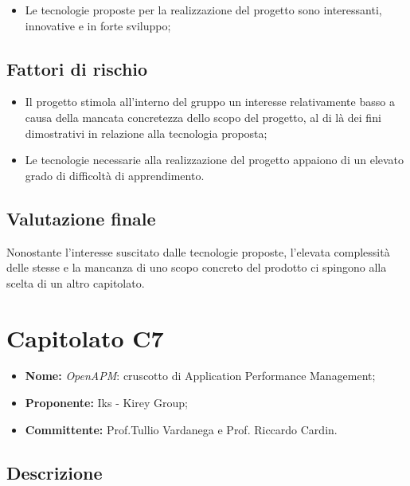 \documentclass[openany,12pt,a4paper]{report}
\begin{document}
	\begin{itemize}
		\item Le tecnologie proposte per la realizzazione del progetto sono interessanti, innovative e in forte sviluppo;
	\end{itemize}

	\subsection{Fattori di rischio}

	\begin{itemize}
		\item Il progetto stimola all'interno del gruppo un interesse relativamente basso a causa della mancata concretezza dello scopo del progetto, al di là dei fini dimostrativi in relazione alla tecnologia proposta;

		\item Le tecnologie necessarie alla realizzazione del progetto appaiono di un elevato grado di difficoltà di apprendimento.
	\end{itemize}

	\subsection{Valutazione finale}

	Nonostante l'interesse suscitato dalle tecnologie proposte, l'elevata complessità delle stesse e la mancanza di uno scopo concreto del prodotto ci spingono alla scelta di un altro capitolato.


	\section{Capitolato C7}

	\begin{itemize}
		\item \textbf{Nome:} \textit{OpenAPM}: cruscotto di Application Performance Management;
		\item \textbf{Proponente:} Iks - Kirey Group;
		\item \textbf{Committente:} Prof.Tullio Vardanega e Prof. Riccardo Cardin.
	\end{itemize}

	\subsection{Descrizione}
\end{document}
